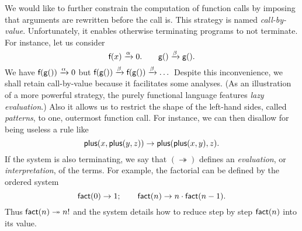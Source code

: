 We would like to further constrain the computation of function calls
by imposing that arguments are rewritten before the call is. This
strategy is named \emph{call\hyp{}by\hyp{}value}.\label{def:call-by-value} Unfortunately, it
enables otherwise terminating programs to not terminate. For instance,
let us consider
\begin{equation*}
\textsf{f}(x) \xrightarrow{\smash{\alpha}} 0.\qquad 
\textsf{g}() \xrightarrow{\smash{\beta}} \textsf{g}().
\end{equation*}
We have \(\textsf{f}(\textsf{g}()) \xrightarrow{\smash{\alpha}} 0\) but
\(\textsf{f}(\textsf{g}()) \xrightarrow{\smash{\beta}} \textsf{f}(\textsf{g}())
\xrightarrow{\smash{\beta}} \dots\) Despite this inconvenience, we
shall retain call\hyp{}by\hyp{}value because it facilitates some
analyses. (As an illustration of a more powerful strategy, the purely
functional language \Haskell \citep{DoetsVanEijck_2004} features
\emph{lazy evaluation}.) Also it allows us to restrict the shape of
the left\hyp{}hand sides, called \emph{patterns}, to one, outermost function call. For instance, we
can then disallow for being useless a rule like
\begin{equation*}
\textsf{plus}(x,\textsf{plus}(y,z)) \rightarrow
\textsf{plus}(\textsf{plus}(x,y),z).
\end{equation*}
If the system is also terminating, we say that
\((\twoheadrightarrow)\) defines an \emph{evaluation}, or \emph{interpretation}, of the terms. For example,
the factorial
 can be defined by the ordered
system
\begin{equation}
\textsf{fact}(0) \rightarrow 1;\qquad
\textsf{fact}(n) \rightarrow n \cdot \textsf{fact}(n-1).
\label{def:fact}
\end{equation}
Thus \(\textsf{fact}(n) \twoheadrightarrow n!\) and the system details
how to reduce step by step \(\textsf{fact}(n)\) into its value.


